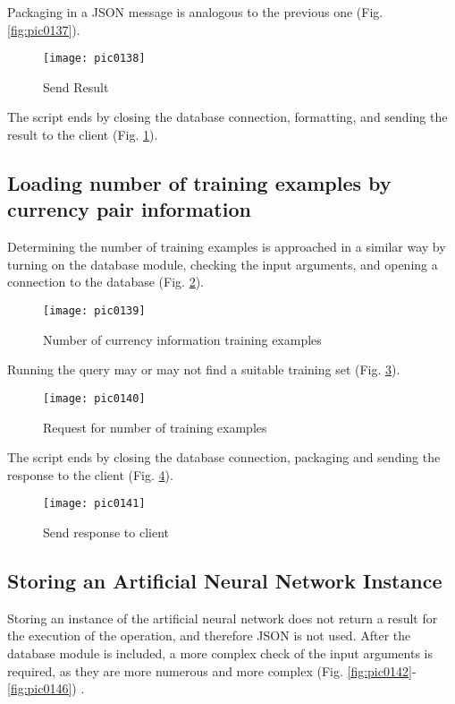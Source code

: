 Packaging in a JSON message is analogous to the previous one (Fig. \ref{fig:pic0137}).

\begin{figure}[h]
\centering
\texttt{[image: pic0138]}
\caption{Send Result}
\label{fig:pic0138}
\end{figure}
\FloatBarrier

The script ends by closing the database connection, formatting, and sending the result to the client (Fig. \ref{fig:pic0138}).

\subsection{Loading number of training examples by currency pair information}

Determining the number of training examples is approached in a similar way by turning on the database module, checking the input arguments, and opening a connection to the database (Fig. \ref{fig:pic0139}).

\begin{figure}[h]
\centering
\texttt{[image: pic0139]}
\caption{Number of currency information training examples}
\label{fig:pic0139}
\end{figure}
\FloatBarrier

Running the query may or may not find a suitable training set (Fig. \ref{fig:pic0140}).

\begin{figure}[h]
\centering
\texttt{[image: pic0140]}
\caption{Request for number of training examples}
\label{fig:pic0140}
\end{figure}
\FloatBarrier

The script ends by closing the database connection, packaging and sending the response to the client (Fig. \ref{fig:pic0141}).

\begin{figure}[h]
\centering
\texttt{[image: pic0141]}
\caption{Send response to client}
\label{fig:pic0141}
\end{figure}
\FloatBarrier

\subsection{Storing an Artificial Neural Network Instance}

Storing an instance of the artificial neural network does not return a result for the execution of the operation, and therefore JSON is not used. After the database module is included, a more complex check of the input arguments is required, as they are more numerous and more complex (Fig. \ref{fig:pic0142}-\ref{fig:pic0146}) .

